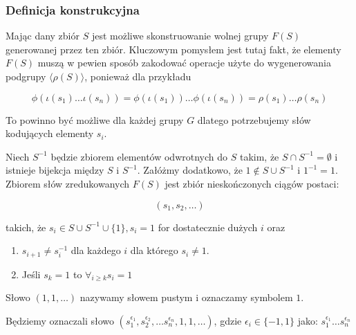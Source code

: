 \subsubsection{Definicja konstrukcyjna}
Mając dany zbiór $S$ jest możliwe skonstruowanie wolnej grupy $F(S)$ generowanej
przez ten zbiór. Kluczowym pomysłem jest tutaj fakt, że elementy $F(S)$ muszą w
pewien sposób zakodować operacje użyte do wygenerowania podgrupy
$\langle \rho(S) \rangle$, ponieważ dla przykładu

\[
\phi\left(\iota\left(s_1\right) \ldots \iota\left(s_n\right)\right)
=
\phi\left(\iota\left(s_1\right)\right) \ldots \phi\left(\iota\left(s_n\right)\right)
=
\rho\left(s_1\right)\ldots\rho\left(s_n\right)\]

To powinno być możliwe dla każdej grupy $G$ dlatego potrzebujemy słów kodujących
elementy $s_i$.

\begin{defin}
  Niech $S^{-1}$ będzie zbiorem elementów odwrotnych do $S$ takim, że $S \cap
  S^{-1} = \emptyset$ i istnieje bijekcja między $S$ i $S^{-1}$. Załóżmy
  dodatkowo, że $1 \not \in S \cup S^{-1}$ i $1^{-1} = 1$.  Zbiorem słów
  zredukowanych $F(S)$ jest zbiór nieskończonych ciągów postaci:

  \[(s_1, s_2, \ldots)\]

  takich, że $s_i \in S \cup S^{-1} \cup \{1\}, s_i = 1$ for dostatecznie dużych
  $i$ oraz

\begin{enumerate}
  \item $s_{i+1} \neq s_i^{-1}$ dla każdego $i$ dla którego $s_i \neq 1$.
  \item Jeśli $s_k = 1$ to $\forall_{i \geq k} s_i = 1$
\end{enumerate}
\end{defin}

Słowo $(1,1,\ldots)$ nazywamy słowem pustym i oznaczamy symbolem $1$.

Będziemy oznaczali słowo $
(s_1^{\epsilon_1},
s_2^{\epsilon_2}, \ldots
s_n^{\epsilon_n}, 1, 1, \ldots)$, gdzie $\epsilon_i \in \{-1, 1\}$ jako:
$s_1^{\epsilon_1}\ldots s_n^{\epsilon_n}$

